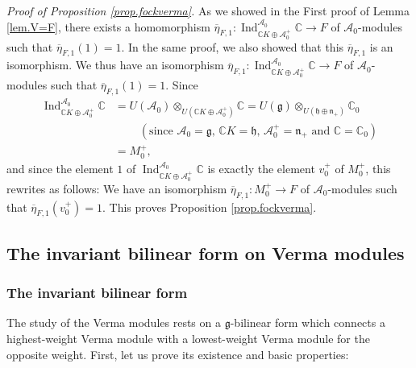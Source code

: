 \documentclass
[numbers=enddot,12pt,final,onecolumn,german,notitlepage]{scrartcl}%
\theoremstyle{definition}
\begin{document}
\textit{Proof of Proposition \ref{prop.fockverma}.} As we showed in the First
proof of Lemma \ref{lem.V=F}, there exists a homomorphism $\overline{\eta
}_{F,1}:\operatorname*{Ind}\nolimits_{\mathbb{C}K\oplus\mathcal{A}_{0}^{+}%
}^{\mathcal{A}_{0}}\mathbb{C}\rightarrow F$ of $\mathcal{A}_{0}$-modules such
that $\overline{\eta}_{F,1}\left(  1\right)  =1$. In the same proof, we also
showed that this $\overline{\eta}_{F,1}$ is an isomorphism. We thus have an
isomorphism $\overline{\eta}_{F,1}:\operatorname*{Ind}\nolimits_{\mathbb{C}%
K\oplus\mathcal{A}_{0}^{+}}^{\mathcal{A}_{0}}\mathbb{C}\rightarrow F$ of
$\mathcal{A}_{0}$-modules such that $\overline{\eta}_{F,1}\left(  1\right)
=1$. Since%
\begin{align*}
\operatorname*{Ind}\nolimits_{\mathbb{C}K\oplus\mathcal{A}_{0}^{+}%
}^{\mathcal{A}_{0}}\mathbb{C}  &  =U\left(  \mathcal{A}_{0}\right)
\otimes_{U\left(  \mathbb{C}K\oplus\mathcal{A}_{0}^{+}\right)  }%
\mathbb{C}=U\left(  \mathfrak{g}\right)  \otimes_{U\left(  \mathfrak{h}%
\oplus\mathfrak{n}_{+}\right)  }\mathbb{C}_{0}\\
&  \ \ \ \ \ \ \ \ \ \ \left(  \text{since }\mathcal{A}_{0}=\mathfrak{g}%
\text{, }\mathbb{C}K=\mathfrak{h}\text{, }\mathcal{A}_{0}^{+}=\mathfrak{n}%
_{+}\text{ and }\mathbb{C}=\mathbb{C}_{0}\right) \\
&  =M_{0}^{+},
\end{align*}
and since the element $1$ of $\operatorname*{Ind}\nolimits_{\mathbb{C}%
K\oplus\mathcal{A}_{0}^{+}}^{\mathcal{A}_{0}}\mathbb{C}$ is exactly the
element $v_{0}^{+}$ of $M_{0}^{+}$, this rewrites as follows: We have an
isomorphism $\overline{\eta}_{F,1}:M_{0}^{+}\rightarrow F$ of $\mathcal{A}%
_{0}$-modules such that $\overline{\eta}_{F,1}\left(  v_{0}^{+}\right)  =1$.
This proves Proposition \ref{prop.fockverma}.

\subsection{\label{subsect.invform}The invariant bilinear form on Verma
modules}

\subsubsection{The invariant bilinear form}

The study of the Verma modules rests on a $\mathfrak{g}$-bilinear form which
connects a highest-weight Verma module with a lowest-weight Verma module for
the opposite weight. First, let us prove its existence and basic properties:
\end{document}
